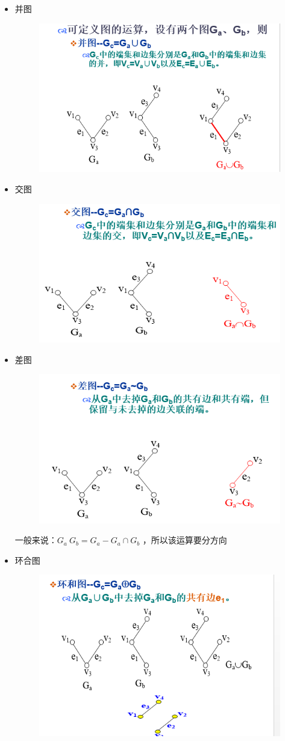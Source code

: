 \begin{itemize}
	\item 并图
	\begin{figure}[H]
		\centering
		\includegraphics[width=0.5\linewidth]{figures/screenshot039}
		\caption{}
		\label{fig:screenshot039}
	\end{figure}
	\item 交图 
	\begin{figure}[H]
		\centering
		\includegraphics[width=0.5\linewidth]{figures/screenshot040}
		\caption{}
		\label{fig:screenshot040}
	\end{figure}
	\item 差图
	 \begin{figure}[H]
		\centering
		\includegraphics[width=0.7\linewidth]{figures/screenshot041}
		\caption{}
		\label{fig:screenshot041}
	\end{figure}
	一般来说：$ G_a ~ G_b = G_a - G_a\cap G_b $ ，所以该运算要分方向
	\item 环合图
	\begin{figure}[H]
		\centering
		\includegraphics[width=0.7\linewidth]{figures/screenshot042}
		\caption{}
		\label{fig:screenshot042}
	\end{figure}
\end{itemize}
